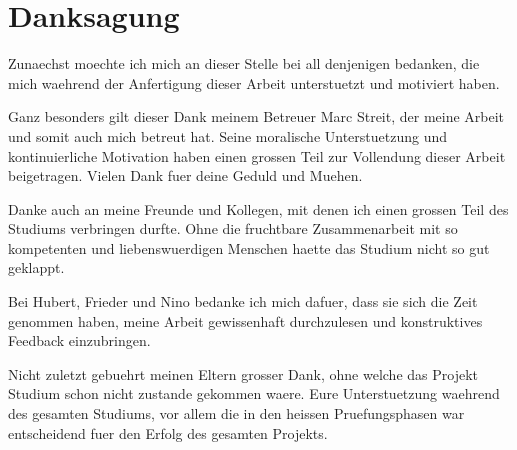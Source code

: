 \section*{Danksagung}
\vspace{0.5cm}

Zunaechst moechte ich mich an dieser Stelle bei all denjenigen bedanken, die mich waehrend der Anfertigung dieser Arbeit unterstuetzt und motiviert haben.

Ganz besonders gilt dieser Dank meinem Betreuer Marc Streit, der meine Arbeit und somit auch mich betreut hat. Seine moralische Unterstuetzung und kontinuierliche Motivation haben einen grossen Teil zur Vollendung dieser Arbeit beigetragen. Vielen Dank fuer deine Geduld und Muehen.

Danke auch an meine Freunde und Kollegen, mit denen ich einen grossen Teil des Studiums verbringen durfte. Ohne die fruchtbare Zusammenarbeit mit so kompetenten und liebenswuerdigen Menschen haette das Studium nicht so gut geklappt.

Bei Hubert, Frieder und Nino bedanke ich mich dafuer, dass sie sich die Zeit genommen haben, meine Arbeit gewissenhaft durchzulesen und konstruktives Feedback einzubringen.

Nicht zuletzt gebuehrt meinen Eltern grosser Dank, ohne welche das Projekt Studium schon nicht zustande gekommen waere. Eure Unterstuetzung waehrend des gesamten Studiums, vor allem die in den heissen Pruefungsphasen war entscheidend fuer den Erfolg des gesamten Projekts.